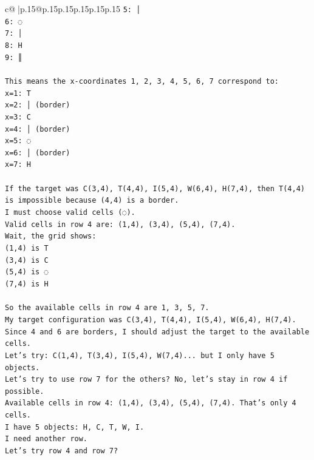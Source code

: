 \documentclass{article}
\begin{document}
{\begin{supertabular}{c@{$\;$}|p{.15\linewidth}@{}p{.15\linewidth}p{.15\linewidth}p{.15\linewidth}p{.15\linewidth}p{.15\linewidth}}
{{{\texttt{5: │} \\
\texttt{6: ◌} \\
\texttt{7: │} \\
\texttt{8: H} \\
\texttt{9: ║} \\
\\ 
\texttt{This means the x{-}coordinates 1, 2, 3, 4, 5, 6, 7 correspond to:} \\
\texttt{x=1: T} \\
\texttt{x=2: │ (border)} \\
\texttt{x=3: C} \\
\texttt{x=4: │ (border)} \\
\texttt{x=5: ◌} \\
\texttt{x=6: │ (border)} \\
\texttt{x=7: H} \\
\\ 
\texttt{If the target was C(3,4), T(4,4), I(5,4), W(6,4), H(7,4), then T(4,4) is impossible because (4,4) is a border.} \\
\texttt{I must choose valid cells (◌).} \\
\texttt{Valid cells in row 4 are: (1,4), (3,4), (5,4), (7,4).} \\
\texttt{Wait, the grid shows:} \\
\texttt{(1,4) is T} \\
\texttt{(3,4) is C} \\
\texttt{(5,4) is ◌} \\
\texttt{(7,4) is H} \\
\\ 
\texttt{So the available cells in row 4 are 1, 3, 5, 7.} \\
\texttt{My target configuration was C(3,4), T(4,4), I(5,4), W(6,4), H(7,4).} \\
\texttt{Since 4 and 6 are borders, I should adjust the target to the available cells.} \\
\texttt{Let's try: C(1,4), T(3,4), I(5,4), W(7,4)... but I only have 5 objects.} \\
\texttt{Let's try to use row 7 for the others? No, let's stay in row 4 if possible.} \\
\texttt{Available cells in row 4: (1,4), (3,4), (5,4), (7,4). That's only 4 cells.} \\
\texttt{I have 5 objects: H, C, T, W, I.} \\
\texttt{I need another row.} \\
\texttt{Let's try row 4 and row 7?} \\
}}}
\end{supertabular}}
\end{document}
